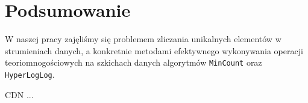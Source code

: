 \chapter{Podsumowanie}
\thispagestyle{chapterBeginStyle}

W naszej pracy zajęliśmy się problemem zliczania unikalnych elementów w strumieniach danych, a konkretnie metodami efektywnego wykonywania operacji teoriomnogościowych na szkichach danych algorytmów \texttt{MinCount} oraz \texttt{HyperLogLog}.

CDN ...



